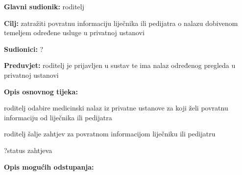                     \noindent {}
					\begin{packed_item}
	
						\item \textbf{Glavni sudionik: }roditelj
						\item  \textbf{Cilj:} zatražiti povratnu informaciju liječnika ili pedijatra o nalazu dobivenom temeljem određene usluge u privatnoj ustanovi
						\item  \textbf{Sudionici:} ?
						\item  \textbf{Preduvjet:} roditelj je prijavljen u sustav te ima nalaz određenog pregleda u privatnoj ustanovi
						\item  \textbf{Opis osnovnog tijeka:}
						
						\item[] \begin{packed_enum}
	
							\item roditelj odabire medicinski nalaz iz privatne ustanove za koji želi povratnu informaciju od liječnika ili pedijatra
							\item roditelj šalje zahtjev za povratnom informacijom liječniku ili pedijatru
							\item  ?status zahtjeva

						\end{packed_enum}
						
						\item  \textbf{Opis mogućih odstupanja:}
						
						\item[] \begin{packed_item}
	
							\item[2.a] 
							\item[] \begin{packed_enum}
								
								\item 
								\item 
							\end{packed_enum}
							
						\end{packed_item}
					\end{packed_item}


